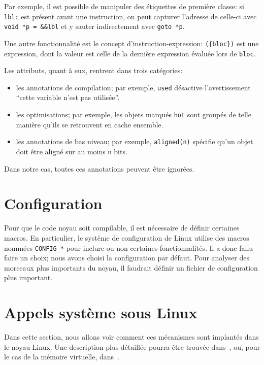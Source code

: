 Par exemple, il est possible de manipuler des étiquettes de première classe: si
\texttt{lbl:} est présent avant une instruction, on peut capturer l'adresse de
celle-ci avec \texttt{void *p = \&\&lbl} et y sauter indirectement avec
\texttt{goto *p}.

Une autre fonctionnalité est le concept d'instruction-expression:
\texttt{(\{bloc\})} est une expression, dont la valeur est celle de la dernière
expression évaluée lors de \texttt{bloc}.

Les attributs, quant à eux, rentrent dans trois catégories:

\begin{itemize}
  \item les annotations de compilation; par exemple, \texttt{used} désactive
  l'avertissement \enquote{cette variable n'est pas utilisée}.

  \item les optimisations; par exemple, les objets marqués \texttt{hot} sont
    groupés de telle manière qu'ils se retrouvent en cache ensemble.

  \item les annotations de bas niveau; par exemple, \verb!aligned(n)!
    spécifie qu'un objet doit être aligné sur au moins \texttt{n} bits.
\end{itemize}

Dans notre cas, toutes ces annotations peuvent être ignorées.

\section{Configuration}

Pour que le code noyau soit compilable, il est nécessaire de définir certaines
macros. En particulier, le système de configuration de Linux utilise des macros
nommées \texttt{CONFIG\_*} pour inclure ou non certaines fonctionnalités. Il a
donc fallu faire un choix; nous avons choisi la configuration par défaut. Pour
analyser des morceaux plus importants du noyau, il faudrait définir un fichier
de configuration plus important.

\section{Appels système sous Linux}
\label{sec:linux-sys}

Dans cette section, nous allons voir comment ces mécanismes sont implantés dans
le noyau Linux. Une description plus détaillée pourra être trouvée
dans~\cite{UnderstandingTheLinuxKernel}, ou, pour le cas de la mémoire
virtuelle, dans~\cite{LinuxVMM}.

